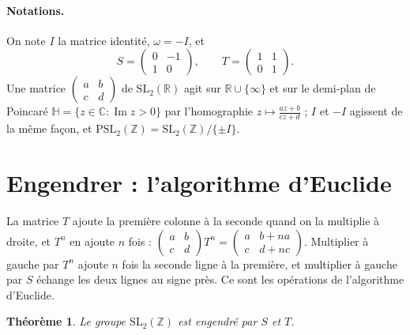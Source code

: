 \documentclass[11pt,a4paper]{article}
\theoremstyle{plain}
\newtheorem{theoreme}{Théorème}[section]
\theoremstyle{definition}
\theoremstyle{remark}
\newcommand{\Z}{\mathbb{Z}}
\newcommand{\R}{\mathbb{R}}
\newcommand{\C}{\mathbb{C}}
\newcommand{\Hp}{\mathbb{H}}
\newcommand{\SL}{\mathrm{SL}}
\newcommand{\PSL}{\mathrm{PSL}}
\begin{document}
\paragraph{Notations.} On note $I$ la matrice identité, $\omega=-I$, et
\[
  S=\begin{pmatrix}0&-1\\1&0\end{pmatrix},\qquad T=\begin{pmatrix}1&1\\0&1\end{pmatrix}.
\]
Une matrice $\begin{pmatrix}a&b\\c&d\end{pmatrix}$ de $\SL_2(\R)$ agit sur $\R\cup\{\infty\}$ et sur le demi-plan de Poincaré $\Hp=\{z\in\C:\operatorname{Im}z>0\}$ par l'homographie $z\mapsto\frac{az+b}{cz+d}$ ; $I$ et $-I$ agissent de la même façon, et $\PSL_2(\Z)=\SL_2(\Z)/\{\pm I\}$.

\tableofcontents

\section{Engendrer : l'algorithme d'Euclide}

La matrice $T$ ajoute la première colonne à la seconde quand on la multiplie à droite, et $T^n$ en ajoute $n$ fois : $\begin{pmatrix}a&b\\c&d\end{pmatrix}T^n=\begin{pmatrix}a&b+na\\c&d+nc\end{pmatrix}$. Multiplier à gauche par $T^n$ ajoute $n$ fois la seconde ligne à la première, et multiplier à gauche par $S$ échange les deux lignes au signe près. Ce sont les opérations de l'algorithme d'Euclide.

\begin{theoreme}\label{thm:generateurs}
Le groupe $\SL_2(\Z)$ est engendré par $S$ et $T$.
\end{theoreme}
\end{document}

